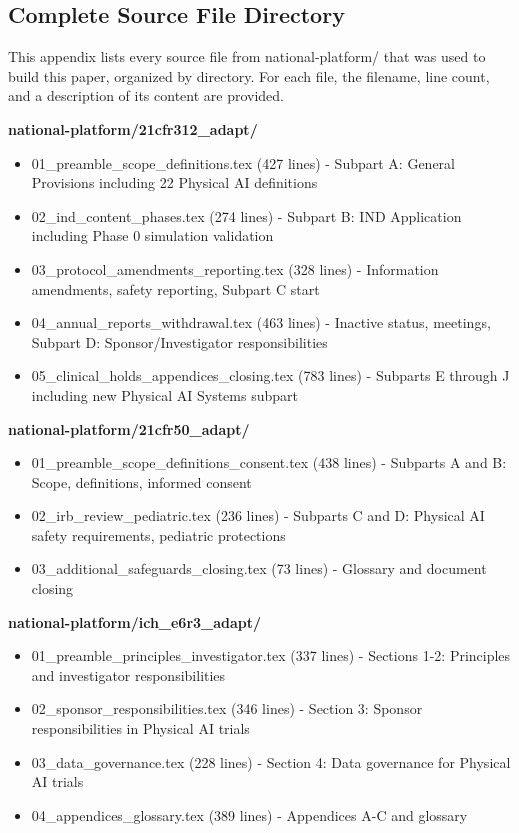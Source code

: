 \pagestyle{appendix}
\appendix
\renewcommand{\thesubsection}{\Alph{subsection}}

\subsection{Complete Source File Directory}
\label{app:source-files}

This appendix lists every source file from national-platform/ that was used to
build this paper, organized by directory. For each file, the filename, line
count, and a description of its content are provided.

\noindent\textbf{national-platform/21cfr312\_adapt/}
\begin{itemize}[nosep]
  \item 01\_preamble\_scope\_definitions.tex (427 lines) - Subpart A: General
    Provisions including 22 Physical AI definitions
  \item 02\_ind\_content\_phases.tex (274 lines) - Subpart B: IND Application
    including Phase 0 simulation validation
  \item 03\_protocol\_amendments\_reporting.tex (328 lines) - Information
    amendments, safety reporting, Subpart C start
  \item 04\_annual\_reports\_withdrawal.tex (463 lines) - Inactive status,
    meetings, Subpart D: Sponsor/Investigator responsibilities
  \item 05\_clinical\_holds\_appendices\_closing.tex (783 lines) - Subparts
    E through J including new Physical AI Systems subpart
\end{itemize}

\noindent\textbf{national-platform/21cfr50\_adapt/}
\begin{itemize}[nosep]
  \item 01\_preamble\_scope\_definitions\_consent.tex (438 lines) - Subparts
    A and B: Scope, definitions, informed consent
  \item 02\_irb\_review\_pediatric.tex (236 lines) - Subparts C and D:
    Physical AI safety requirements, pediatric protections
  \item 03\_additional\_safeguards\_closing.tex (73 lines) - Glossary and
    document closing
\end{itemize}

\noindent\textbf{national-platform/ich\_e6r3\_adapt/}
\begin{itemize}[nosep]
  \item 01\_preamble\_principles\_investigator.tex (337 lines) - Sections 1-2:
    Principles and investigator responsibilities
  \item 02\_sponsor\_responsibilities.tex (346 lines) - Section 3: Sponsor
    responsibilities in Physical AI trials
  \item 03\_data\_governance.tex (228 lines) - Section 4: Data governance
    for Physical AI trials
  \item 04\_appendices\_glossary.tex (389 lines) - Appendices A-C and glossary
\end{itemize}

